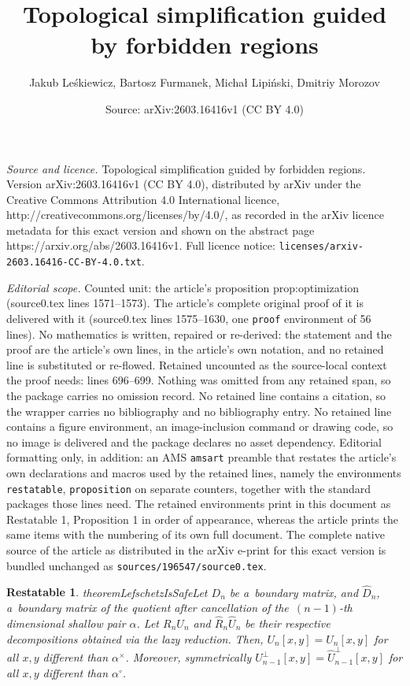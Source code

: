 \documentclass[10pt,a4paper]{amsart}
\title{Topological simplification guided by forbidden regions}
\author{Jakub Le\'skiewicz, Bartosz Furmanek, Micha{\l} Lipi\'nski, Dmitriy Morozov}
\date{Source: arXiv:2603.16416v1 (CC BY 4.0)}
\newtheorem{restatable}{Restatable}
\newcommand{\bds}{\alpha}
\newcommand{\bth}[1]{#1^\circ}
\newcommand{\cmU}{\mU^{\perp}}
\newcommand{\cmUaft}{\hat{\mU}^{\perp}}
\newcommand{\dth}[1]{#1^{\!\times}}
\newcommand{\hmB}{D}
\newcommand{\hmBaft}{\hat{\mB}}
\newcommand{\hmU}{\mU}
\newcommand{\hmUaft}{\hat{\mU}}
\newcommand{\mB}{D}
\newcommand{\mU}{U}
\begin{document}
\maketitle

\noindent\emph{Source and licence.} Topological simplification guided by forbidden regions. Version arXiv:2603.16416v1 (CC BY 4.0), distributed by arXiv under the Creative Commons Attribution 4.0 International licence, http://creativecommons.org/licenses/by/4.0/, as recorded in the arXiv licence metadata for this exact version and shown on the abstract page https://arxiv.org/abs/2603.16416v1. Full licence notice: \texttt{licenses/arxiv-2603.16416-CC-BY-4.0.txt}.\par\smallskip

\noindent\textit{Editorial scope.} Counted unit: the article's proposition prop:optimization (source0.tex lines 1571--1573). The article's complete original proof of it is delivered with it (source0.tex lines 1575--1630, one \texttt{proof} environment of 56 lines). No mathematics is written, repaired or re-derived: the statement and the proof are the article's own lines, in the article's own notation, and no retained line is substituted or re-flowed.  Retained uncounted as the source-local context the proof needs: lines 696--699.  Nothing was omitted from any retained span, so the package carries no omission record.  No retained line contains a citation, so the wrapper carries no bibliography and no bibliography entry.  No retained line contains a figure environment, an image-inclusion command or drawing code, so no image is delivered and the package declares no asset dependency.  Editorial formatting only, in addition: an AMS \texttt{amsart} preamble that restates the article's own declarations and macros used by the retained lines, namely the environments \texttt{restatable}, \texttt{proposition} on separate counters, together with the standard packages those lines need.  The retained environments print in this document as Restatable 1, Proposition 1 in order of appearance, whereas the article prints the same items with the numbering of its own full document.  The complete native source of the article as distributed in the arXiv e-print for this exact version is bundled unchanged as \texttt{sources/196547/source0.tex}.
\begin{restatable}{theorem}{LefschetzIsSafe}\label{thm:lefschetz_is_safe}
    Let $\hmB_{n}$ be a~boundary matrix,  
        and $\hmBaft_{n}$, a~boundary matrix of the quotient after cancellation of the~$(n-1)$-th dimensional shallow pair $\bds$.  Let $R_{n}\hmU_{n}$ and $\hat{R}_{n}\hmUaft_{n}$ be their respective decompositions obtained via the lazy reduction. Then, $\hmU_{n}[x,y] = \hmUaft_{n}[x,y]$ for all $x,y$ different than $\dth\bds$. Moreover, symmetrically $\cmU_{n-1}[x,y] = \cmUaft_{n-1}[x,y]$ for all $x,y$ different than $\bth\bds$.
\end{restatable}
\end{document}

